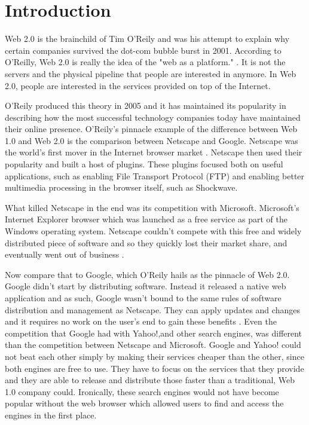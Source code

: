 \documentclass[12pt]{article}
\begin{document}
\section{Introduction}
Web 2.0 is the brainchild of Tim O'Reily and was his attempt to explain why certain companies survived the dot-com bubble burst in 2001.  According to O'Reilly, Web 2.0 is really the idea of the "web as a platform." \cite{what_is_web2}.  It is not the servers and the physical pipeline that people are interested in anymore.  In Web 2.0, people are interested in the services provided on top of the Internet.

O'Reily produced this theory in 2005 and it has maintained its popularity in describing how the most successful technology companies today have maintained their online presence.  O'Reily's pinnacle example of the difference between Web 1.0 and Web 2.0 is the comparison between Netscape and Google.  Netscape was the world's first mover in the Internet browser market \cite{netscape_history}.  Netscape then used their popularity and built a host of plugins.  These plugins focused both on useful applications, such as enabling File Transport Protocol (FTP) and enabling better multimedia processing in the browser itself, such as Shockwave.

What killed Netscape in the end was its competition with Microsoft.  Microsoft's Internet Explorer browser which was launched as a free service as part of the Windows operating system.  Netscape couldn't compete with this free and widely distributed piece of software and so they quickly lost their market share, and eventually went out of business \cite{netscape_history}.

Now compare that to Google, which O'Reily hails as the pinnacle of Web 2.0.  Google didn't start by distributing software.  Instead it released a native web application and as such, Google wasn't bound to the same rules of software distribution and management as Netscape.  They can apply updates and changes and it requires no work on the user's end to gain these benefits \cite{what_is_web2}.  Even the competition that Google had with Yahoo!,and other search engines, was different than the competition between Netscape and Microsoft.  Google and Yahoo! could not beat each other simply by making their services cheaper than the other, since both engines are free to use.  They have to focus on the services that they provide and they are able to release and distribute those faster than a traditional, Web 1.0 company could.  Ironically, these search engines would not have become popular without the web browser which allowed users to find and access the engines in the first place.
\end{document}
